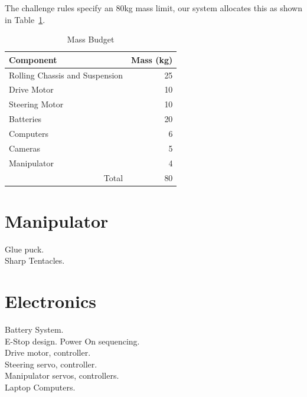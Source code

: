 \documentclass[12pt]{article}
\begin{document}
The challenge rules specify an 80kg mass limit, our system allocates this as shown in Table~\ref{tab massb}.

\begin{table}[htbp]
    \begin{center}
    \begin{tabular}{lr}
        \hline
        Component & Mass (kg)\\
        \hline
        Rolling Chassis and Suspension & 25\\
        Drive Motor & 10\\
        Steering Motor & 10\\
        Batteries & 20\\
        Computers & 6\\
        Cameras & 5\\
        Manipulator & 4\\
        \hline
        \hline
        \multicolumn{1}{r}{Total} & 80\\
        \hline
    \end{tabular}
    \end{center}
    \caption{Mass Budget}
    \label{tab massb}
\end{table}

\section{Manipulator}\label{Manipulator}

Glue puck.\\

Sharp Tentacles.\\

\section{Electronics}\label{Electronics}

Battery System.\\

E-Stop design. Power On sequencing.\\

Drive motor, controller.\\

Steering servo, controller.\\

Manipulator servos, controllers.\\

Laptop Computers.\\
\end{document}
